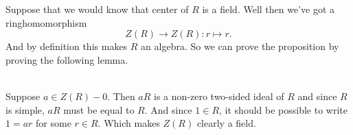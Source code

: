 \newpage
{}
Suppose that we would know that center of $R$ is a field. Well then we've got a ringhomomorphism 
\[Z(R) \to Z(R) : r \mapsto r .\]
And by definition this makes $R$ an algebra. So we can prove the proposition by proving the following lemma. 

\\

Suppose $a\in Z(R)-{0}$. Then $aR$ is a non-zero two-sided ideal of $R$ and since $R$ is simple, $aR$ must be equal to $R$. And since $1 \in R$, it should be possible to write $1 = ar$ for some $r\in R$. Which makes $Z(R)$ clearly a field. 
\\